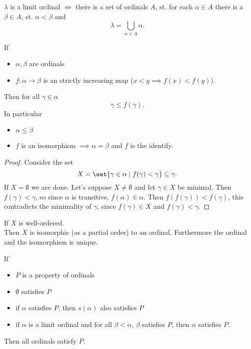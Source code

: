 \begin{exercise}
    $\lambda$ is a limit ordinal $\iff$ there is a set of ordinals $A$, 
    st. for each $\alpha \in A$ there is a $\beta \in A$, st. $\alpha < \beta$ and 
    $$ \lambda = \bigcup_{\alpha \in A} \alpha.$$
\end{exercise}

\begin{lemma}
    If 
    \begin{itemize}
        \item $\alpha, \beta$ are ordinals
        \item $f: \alpha \to \beta$ is an strictly increasing map ($x<y \implies f(x) < f(y)$).
    \end{itemize}
    Then for all $\gamma \in \alpha$
    $$ \gamma \leq f(\gamma).$$
    In particular 
    \begin{itemize}
        \item $\alpha \leq \beta$
        \item $f$ is an isomorphism $ \implies \alpha = \beta$ and $f$ is the identify.
    \end{itemize}
\end{lemma}
\begin{proof}
    Consider the set
    $$ X = \set{\gamma \in \alpha \mid f(\gamma) < \gamma} \subseteq \gamma.$$
    If $X = \emptyset$ we are done. Let's suppose $X \ne \emptyset$ and let $\gamma \in X$ be minimal.
    Then $f(\gamma) < \gamma$, so since $\alpha$ is transitive, $f(\alpha) \in \alpha$.
    Then $f(f(\gamma)) < f(\gamma)$, this contradicts the minimality of $\gamma$, since $f(\gamma) \in X$ and $f(\gamma) < \gamma$.    
\end{proof}

\begin{theorem}\label{thm:1}
    If $X$ is well-ordered.\\
    Then $X$ is isomorphic (as a partial order) to an ordinal. Furthermore the ordinal and the isomorphism is unique.
\end{theorem}

\begin{theorem}
    If
    \begin{itemize}
        \item $P$ is a property of ordinals
        \item $\emptyset$ satisfies $P$
        \item if $\alpha$ satisfies $P$, then $s(\alpha)$ also satisfies $P$
        \item if $\alpha$ is a limit ordinal and for all $\beta < \alpha$, $\beta$ satisfies $P$, then
        $\alpha$ satisfies $P$.
    \end{itemize}
    Then all ordinals satisfy $P$.
\end{theorem}


